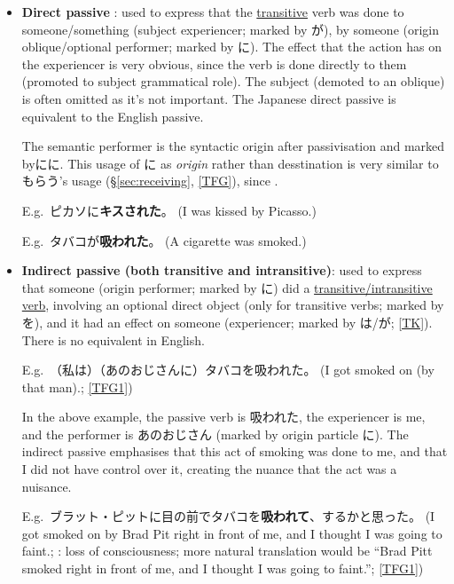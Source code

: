\documentclass[../nihongo-gakushuu-kyouzai.tex]{subfiles}
\begin{document}
\begin{itemize}
    \item \textbf{Direct passive }: used to express that the \ul{transitive} verb was done to someone/something (subject experiencer; marked by が), by someone (origin oblique/optional performer; marked by に). The effect that the action has on the experiencer is very obvious, since the verb is done directly to them (promoted to subject grammatical role). The subject (demoted to an oblique) is often omitted as it's not important. The Japanese direct passive is equivalent to the English passive.

    The semantic performer is the syntactic origin after passivisation and marked byにに. This usage of に as \emph{origin} rather than desstination is very similar to もらう's usage (\S\ref{sec:receiving}, \href{https://www.tofugu.com/japanese-grammar/particle-ni/\#in-social-interactions-and-transactions}{[TFG]}), since .

    E.g.\ ピカソに\textbf{キスされた}。 (I was kissed by Picasso.)

    E.g.\ タバコが\textbf{吸われた}。 (A cigarette was smoked.)

    \item \textbf{Indirect passive (both transitive and intransitive)}: used to express that someone (origin performer; marked by に) did a \ul{transitive/intransitive verb}, involving an optional direct object (only for transitive verbs; marked by を), and it had an effect on someone (experiencer; marked by は/が; \href{https://www.guidetojapanese.org/blog/2005/09/09/no-suffering-passive/\#comment-9210}{[TK]}). There is no equivalent in English. 

    E.g.\ （私は）（あのおじさんに）タバコを吸われた。 (I got smoked on (by that man).; \href{https://www.tofugu.com/japanese-grammar/verb-passive-form-rareru\#direct-vs-indirect-passive}{[TFG1]})

    In the above example, the passive verb is 吸われた, the experiencer is me, and the performer is あのおじさん (marked by origin particle に). The indirect passive emphasises that this act of smoking was done to me, and that I did not have control over it, creating the nuance that the act was a nuisance.

    E.g.\ ブラット・ピットに目の前でタバコを\textbf{吸われて}、するかと思った。 (I got smoked on by Brad Pit right in front of me, and I thought I was going to faint.; : loss of consciousness; more natural translation would be ``Brad Pitt smoked right in front of me, and I thought I was going to faint.''; \href{https://www.tofugu.com/japanese-grammar/verb-passive-form-rareru\#direct-vs-indirect-passive}{[TFG1]})


\end{itemize}
\end{document}
